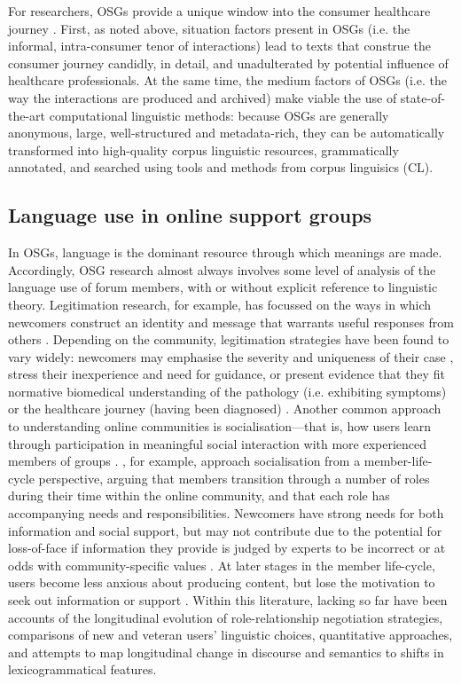 \documentclass{article}
\renewcommand{\cite}{\parencite}
\begin{document}
For researchers, OSGs provide a unique window into the consumer healthcare journey \cite{harvey_disclosures_2012}. First, as noted above, situation factors present in OSGs (i.e. the informal, intra-consumer tenor of interactions) lead to texts that construe the consumer journey candidly, in detail, and unadulterated by potential influence of healthcare professionals. At the same time, the medium factors of OSGs (i.e. the way the interactions are produced and archived) make viable the use of state-of-the-art computational linguistic methods: because OSGs are generally anonymous, large, well-structured and metadata-rich, they can be automatically transformed into high-quality corpus linguistic resources, grammatically annotated, and searched using tools and methods from corpus linguisics (CL). 

\subsection{Language use in online support groups} \label{sect:intro-lang-in-osg}

In OSGs, language is the dominant resource through which meanings are made. Accordingly, OSG research almost always involves some level of analysis of the language use of forum members, with or without explicit reference to linguistic theory. Legitimation research, for example, has focussed on the ways in which newcomers construct an identity and message that warrants useful responses from others \cite{galegher_legitimacy_1998,west_facework_2010}. Depending on the community, legitimation strategies have been found to vary widely: newcomers may emphasise the severity and uniqueness of their case , stress their inexperience and need for guidance, or present evidence that they fit normative biomedical understanding of the pathology (i.e. exhibiting symptoms) or the healthcare journey (having been diagnosed) \cite{varga2014grieving}. Another common approach to understanding online communities is socialisation---that is, how users learn through participation in meaningful social interaction with more experienced members of groups \cite{ochs_socialization_1991}. \textcite{lee_new_2014}, for example, approach socialisation from a member-life-cycle perspective, arguing that members transition through a number of roles during their time within the online community, and that each role has accompanying needs and responsibilities. Newcomers have strong needs for both information and social support, but may not contribute due to the potential for loss-of-face if information they provide is judged by experts to be incorrect \cite{fuller_innovation_2007} or at odds with community-specific values \cite{weber_missed_2011}. At later stages in the member life-cycle, users become less anxious about producing content, but lose the motivation to seek out information or support \cite{lee_new_2014}. Within this literature, lacking so far have been accounts of the longitudinal evolution of role-relationship negotiation strategies, comparisons of new and veteran users' linguistic choices, quantitative approaches, and attempts to map longitudinal change in discourse and semantics to shifts in lexicogrammatical features.
\end{document}
